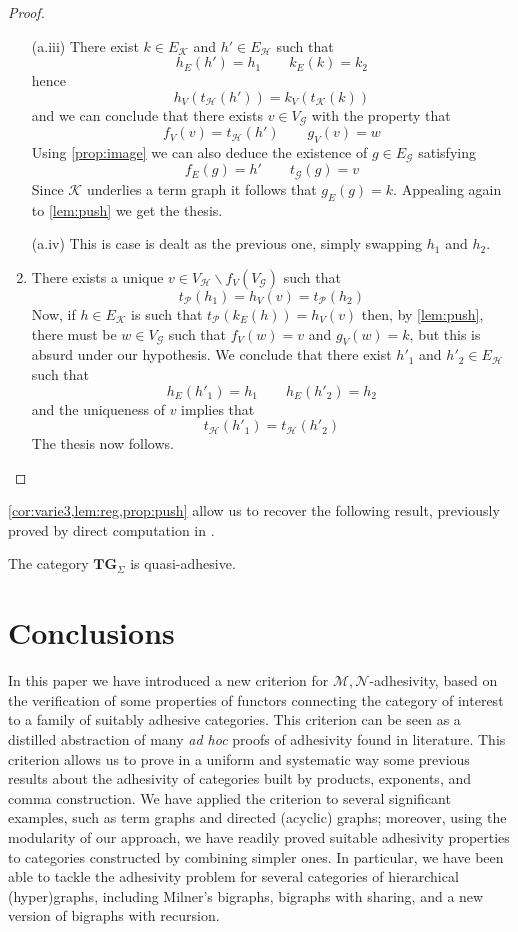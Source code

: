 \documentclass[runningheads,envcountsect]{lmcs}
\newcommand{\catname}[1]{\mathbf{#1}}
\newcommand{\tg}[0]{\catname{TG}_{\Sigma}}
\theoremstyle{plain}
\theoremstyle{definition}
\begin{document}
\begin{proof}
\begin{enumerate}[label=(\alph*)]
	 	\noindent (a.iii) There exist $k\in E_{\mathcal{K}}$ and $h'\in E_{\mathcal{H}}$ such that
	 	\[h_E(h')=h_1\qquad k_E(k)=k_2\]
	 	hence
	 	\[h_V(t_{\mathcal{H}}(h'))=k_V(t_{\mathcal{K}}(k))\]
	 	and we can conclude that there exists $v\in V_{\mathcal{G}}$ with the property that
	 	\[f_V(v)=t_{\mathcal{H}}(h')\qquad g_V(v)=w\] 
	 	Using \cref{prop:image} we can also deduce the existence of $g\in E_\mathcal{G}$ satisfying 
	 	\[ f_E(g)=h' \qquad t_{\mathcal{G}}(g)=v\]
	 	Since $\mathcal{K}$ underlies a term graph it follows that $g_E(g)=k$. Appealing again to \cref{lem:push} we get the thesis.
	 	\medskip 
	 	
	 	\noindent (a.iv) This is case is dealt as the previous one, simply swapping $h_1$ and $h_2$.
	 	\item  There exists a unique $v\in V_\mathcal{H}\smallsetminus f_V(V_{\mathcal{G}})$ such that \[t_{\mathcal{P}}(h_1)=h_V(v)=t_{\mathcal{P}}(h_2)\]
	 	Now, if $h\in E_{\mathcal{K}}$ is such that $t_{\mathcal{P}}(k_E(h))=h_V(v)$ then, by \cref{lem:push}, there must be $w\in V_{\mathcal{G}}$ such that $f_V(w)=v$ and $g_V(w)=k$, but this is absurd under our hypothesis. We conclude that there  exist  $h'_1$ and $h'_2\in E_{\mathcal{H}}$ such that 
	 	\[h_E(h'_1)=h_1 \qquad h_E(h'_2)=h_2\]
	 and the uniqueness of $v$ implies that 
	 \[t_{\mathcal{H}}(h'_1)=t_{\mathcal{H}}(h'_2)\]
	 The thesis now follows.	 	 \qedhere 
	 \end{enumerate}
\end{proof}
\cref{cor:varie3,lem:reg,prop:push} allow us to recover the following result, previously proved by direct computation in \cite[Thm.~4.2]{corradini2005term}.
\begin{cor}
	The category $\tg$ is quasi-adhesive.
\end{cor}



\section{Conclusions}\label{sec:concl}
In this paper we have introduced a new criterion for $\mathcal{M}, \mathcal{N}$-adhesivity, based on the verification of some properties of functors connecting the category of interest to a family of suitably adhesive categories.  This criterion can be seen as a distilled abstraction of many \emph{ad hoc} proofs of adhesivity found in literature.
This criterion allows us to prove in a uniform and systematic way some previous results about the adhesivity of categories built by products, exponents, and comma construction. We have applied the criterion to several significant examples, such as term graphs and directed (acyclic) graphs; moreover, using the modularity of our approach, we have readily proved suitable adhesivity properties to categories constructed by combining simpler ones.  In particular, we have been able to tackle the adhesivity problem for several categories of hierarchical (hyper)graphs, including Milner's bigraphs, bigraphs with sharing, and a new version of bigraphs with recursion.
\end{document}
